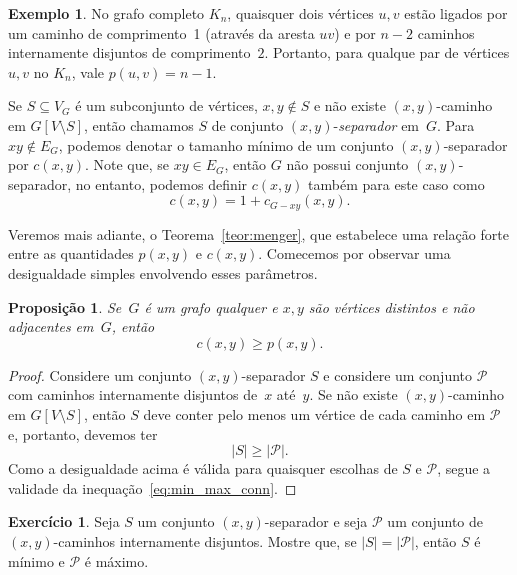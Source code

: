 \documentclass[12pt, a4paper]{article}
\newtheorem{prop}[teor]{Proposição}
\theoremstyle{definition}
\newtheorem{exem}[teor]{Exemplo}
\newtheorem{exer}{Exercício}
\begin{document}
\begin{exem}
No grafo completo $K_n$, quaisquer dois vértices $u,v$ estão ligados por um caminho de comprimento~1 (através da aresta $uv$) e por $n-2$ caminhos internamente disjuntos de comprimento~$2$. Portanto, para qualque par de vértices $u,v$ no $K_n$, vale $p(u,v) = n - 1$.
\end{exem}

Se $S \subseteq V_G$ é um subconjunto de vértices, $x,y \not\in S$ e não existe $(x,y)$-caminho em $G[V \setminus S]$, então chamamos $S$ de conjunto $(x,y)$-\emph{separador} em~$G$. Para $xy \not\in E_G$, podemos denotar o tamanho mínimo de um conjunto $(x,y)$-separador por $c(x,y)$. Note que, se $xy \in E_G$, então $G$ não possui conjunto $(x,y)$-separador, no entanto, podemos definir $c(x,y)$ também para este caso como 
\begin{equation}
  \label{eq:c_adjacent}
   c(x,y) = 1 + c_{G - xy}(x,y). 
\end{equation}

Veremos mais adiante, o Teorema~\ref{teor:menger}, que estabelece uma relação forte entre as quantidades $p(x,y)$ e $c(x,y)$. Comecemos por observar uma desigualdade simples envolvendo esses parâmetros. 

\begin{prop} 
\label{prop:easy_ineq_menger}
Se~$G$ é um grafo qualquer e $x,y$ são vértices distintos e não adjacentes em~$G$, então
  \begin{equation}
    \label{eq:min_max_conn}
     c(x,y) \geq p(x,y).
  \end{equation}
\end{prop}

\begin{proof}
Considere um conjunto $(x,y)$-separador $S$ e considere um conjunto $\mathcal{P}$ com caminhos internamente disjuntos de~$x$ até~$y$. Se não existe $(x,y)$-caminho em $G[V \setminus S]$, então $S$ deve conter pelo menos um vértice de cada caminho em $\mathcal{P}$ e, portanto, devemos ter 
\[ |S| \geq |\mathcal{P}|. \]
Como a desigualdade acima é válida para quaisquer escolhas de $S$ e $\mathcal{P}$, segue a validade da inequação~\eqref{eq:min_max_conn}.
\end{proof}

\begin{exer}
\label{exer:min_max}
Seja $S$ um conjunto $(x,y)$-separador e seja $\mathcal{P}$ um conjunto de $(x,y)$-caminhos internamente disjuntos. Mostre que, se $|S| = |\mathcal{P}|$, então $S$ é mínimo e $\mathcal{P}$ é máximo.
\end{exer}
\end{document}
